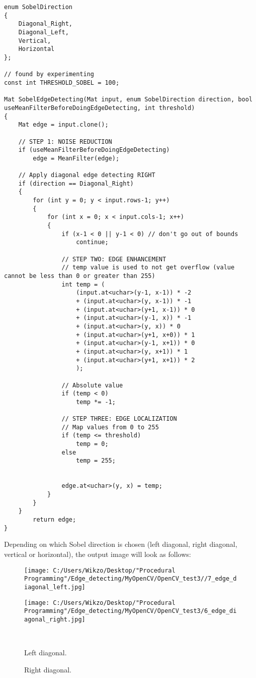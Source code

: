 \begin{lstlisting}
enum SobelDirection
{
	Diagonal_Right,
	Diagonal_Left,
	Vertical,
	Horizontal
};

// found by experimenting
const int THRESHOLD_SOBEL = 100;

Mat SobelEdgeDetecting(Mat input, enum SobelDirection direction, bool useMeanFilterBeforeDoingEdgeDetecting, int threshold)
{
	Mat edge = input.clone();

	// STEP 1: NOISE REDUCTION
	if (useMeanFilterBeforeDoingEdgeDetecting)
		edge = MeanFilter(edge);

	// Apply diagonal edge detecting RIGHT
	if (direction == Diagonal_Right)
	{
		for (int y = 0; y < input.rows-1; y++)
		{
			for (int x = 0; x < input.cols-1; x++)
			{
				if (x-1 < 0 || y-1 < 0) // don't go out of bounds
					continue;

				// STEP TWO: EDGE ENHANCEMENT
				// temp value is used to not get overflow (value cannot be less than 0 or greater than 255)
				int temp = (
					(input.at<uchar>(y-1, x-1)) * -2
					+ (input.at<uchar>(y, x-1)) * -1
					+ (input.at<uchar>(y+1, x-1)) * 0
					+ (input.at<uchar>(y-1, x)) * -1
					+ (input.at<uchar>(y, x)) * 0
					+ (input.at<uchar>(y+1, x+0)) * 1
					+ (input.at<uchar>(y-1, x+1)) * 0
					+ (input.at<uchar>(y, x+1)) * 1
					+ (input.at<uchar>(y+1, x+1)) * 2
					);

				// Absolute value
				if (temp < 0)
					temp *= -1;

				// STEP THREE: EDGE LOCALIZATION
				// Map values from 0 to 255
				if (temp <= threshold)
					temp = 0;
				else
					temp = 255;
				

				edge.at<uchar>(y, x) = temp;
			}
		}
	}
		return edge;
}
\end{lstlisting}

Depending on which Sobel direction is chosen (left diagonal, right diagonal, vertical or horizontal), the output image will look as follows:

\begin{figure}[htbp]\centering
	\begin{minipage}[b]{0.48\textwidth}\centering
		\texttt{[image: C:/Users/Wikzo/Desktop/"Procedural Programming"/Edge\_detecting/MyOpenCV/OpenCV\_test3//7\_edge\_diagonal\_left.jpg]} %
	\end{minipage}\hfill
	\begin{minipage}[b]{0.48\textwidth}\centering
		\texttt{[image: C:/Users/Wikzo/Desktop/"Procedural Programming"/Edge\_detecting/MyOpenCV/OpenCV\_test3/6\_edge\_diagonal\_right.jpg]} %
	\end{minipage}\\ %
	\begin{minipage}[t]{0.48\textwidth}
		\caption{Left diagonal.} %
		\label{left_diagonal}
	\end{minipage}\hfill
	\begin{minipage}[t]{0.48\textwidth}
		\caption{Right diagonal.} %
		\label{right_diagonal}
	\end{minipage}
\end{figure}

